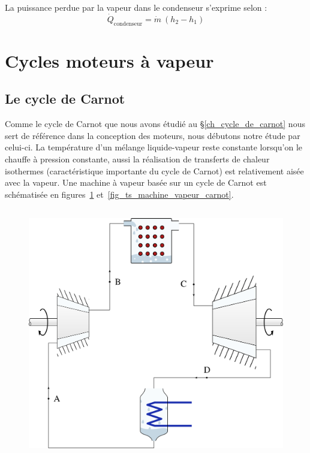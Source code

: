 		La puissance perdue par la vapeur dans le condenseur s’exprime selon :
		\begin{equation}
			\dot{Q}_\text{condenseur} = \dot{m} \ (h_2 - h_1)
		\end{equation}



\section{Cycles moteurs à vapeur}
\label{ch_cycles_moteurs_vapeur}

	\subsection{Le cycle de Carnot}

		Comme le cycle de Carnot que nous avons étudié au \S\ref{ch_cycle_de_carnot} nous sert de référence dans la conception des moteurs, nous débutons notre étude par celui-ci. La température d’un mélange liquide-vapeur reste constante lorsqu’on le chauffe à pression constante, aussi la réalisation de transferts de chaleur isothermes (caractéristique importante du cycle de Carnot) est relativement aisée avec la vapeur. Une machine à vapeur basée sur un cycle de Carnot est schématisée en figures~\ref{fig_machine_vapeur_carnot} et~\ref{fig_ts_machine_vapeur_carnot}.

		\begin{figure}
			\begin{center}
				\includegraphics[height=11cm]{images/circuit_carnot_lv.png}
			\end{center}
			\label{fig_machine_vapeur_carnot}
		\end{figure}

